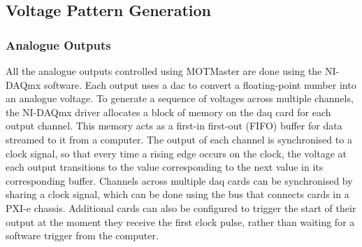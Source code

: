 \subsection{Voltage Pattern Generation}\label{subsec:compinterface_patterngen}
\subsubsection{Analogue Outputs}
All the analogue outputs controlled using MOTMaster are done using the
NI-DAQmx software. Each output uses a \ac{dac} to convert a floating-point
number into an analogue voltage. To generate a sequence of voltages across
multiple channels, the NI-DAQmx driver allocates a block of memory on the
\ac{daq} card for each output channel. This memory acts as a first-in
first-out (FIFO) buffer for data streamed to it from a computer. The output
of each channel is synchronised to a clock signal, so that every time a
rising edge occurs on the clock, the voltage at each output transitions to
the value corresponding to the next value in its corresponding buffer.
Channels across multiple \ac{daq} cards can be synchronised by sharing a
clock signal, which can be done using the bus that connects cards in a PXI-e
chassis. Additional cards can also be configured to trigger the start of
their output at the moment they receive the first clock pulse, rather than
waiting for a software trigger from the computer. \par\noindent
